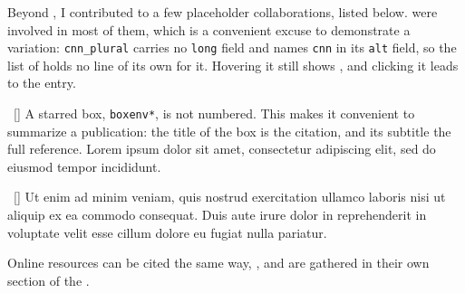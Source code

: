 Beyond , I contributed to a few placeholder collaborations, listed below.
 were involved in most of them, which is a convenient excuse to demonstrate a variation: \verb|cnn_plural| carries no \verb|long| field and names \verb|cnn| in its \verb|alt| field, so the list of  holds no line of its own for it. Hovering it still shows , and clicking it leads to the  entry.

\begin{boxenv*}{\faFlask~\cite{lastname2019chapter}}[]
    A starred box, \texttt{boxenv*}, is not numbered.
    This makes it convenient to summarize a publication: the title of the box is the citation, and its subtitle the full reference.
    Lorem ipsum dolor sit amet, consectetur adipiscing elit, sed do eiusmod tempor incididunt.
\end{boxenv*}

\begin{boxenv*}{\faFlask~\cite{lastname2023workshop}}[]
    Ut enim ad minim veniam, quis nostrud exercitation ullamco laboris nisi ut aliquip ex ea commodo consequat.
    Duis aute irure dolor in reprehenderit in voluptate velit esse cillum dolore eu fugiat nulla pariatur.
\end{boxenv*}

Online resources can be cited the same way, \eg \cite{placeholder_www}, and are gathered in their own section of the .
